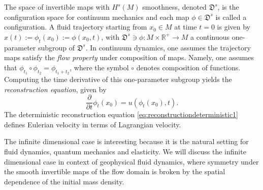\documentclass[11pt, oneside]{article}   	%
\numberwithin{equation}{section}
\theoremstyle{plain}
\theoremstyle{definition}
\theoremstyle{remark}
\newcommand{\<}{\langle}
\renewcommand{\>}{\rangle}
\begin{document}
The space of invertible maps with $H^s(M)$ smoothness, denoted $\mathfrak{D}^s$, is the configuration space for continuum mechanics and each map $\phi\in\mathfrak{D}^s$ is called a configuration. A fluid trajectory starting from $x_0\in M$ at time $t=0$ is given by $x(t):=\phi_t(x_0):=\phi(x_0,t)$, with $\mathfrak{D}^s\ni \phi:M\times\mathbb{R}^+\to M$ a continuous one-parameter subgroup of $\mathfrak{D}^s$. In continuum dynamics, one assumes the trajectory maps satisfy the \emph{flow property} under composition of maps. Namely, one assumes that $\phi_{t_1} \circ \phi_{t_2} = \phi_{t_1+ t_2}$, where the symbol $\circ$ denotes composition of functions.  Computing the time derivative of this one-parameter subgroup yields the \emph{reconstruction equation}, given by
\begin{equation}
\frac{\partial}{\partial t}\phi_t(x_0) = u(\phi_t(x_0),t).
\label{eq:reconstructiondeterministic1}
\end{equation}
The deterministic reconstruction equation \eqref{eq:reconstructiondeterministic1} defines Eulerian velocity in terms of Lagrangian velocity.

The infinite dimensional case is interesting because it is the natural setting for fluid dynamics, quantum mechanics and elasticity. We will discuss the infinite dimensional case in context of geophysical fluid dynamics, where symmetry under the smooth invertible maps of the flow domain is broken by the spatial dependence of the initial mass density. 

\end{document}
